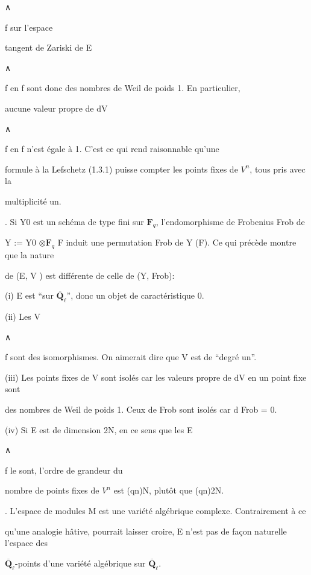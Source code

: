 \documentclass[11pt]{article}
\begin{document}
\noindent ∧\par
\noindent f sur l’espace\par
\noindent tangent de Zariski de E\par
\noindent ∧\par
\noindent f en f sont donc des nombres de Weil de poids 1. En particulier,\par
\noindent aucune valeur propre de dV\par
\noindent ∧\par
\noindent f en f n’est égale à 1. C’est ce qui rend raisonnable qu’une\par
\noindent formule à la Lefschetz (1.3.1) puisse compter les points fixes de \(V^n\), tous pris avec la\par
\noindent multiplicité un.\par
{}. Si Y0 est un schéma de type fini sur \(\mathbf F_q\), l’endomorphisme de Frobenius Frob de\par
\noindent Y := Y0 \(\otimes\)\(\mathbf F_q\) F induit une permutation Frob de Y (F). Ce qui précède montre que la nature\par
\noindent de (E, V ) est différente de celle de (Y, Frob):\par
\noindent (i) E est “sur \(\overline{\mathbf Q}_{\ell}\)”, donc un objet de caractéristique 0.\par
\noindent (ii) Les V\par
\noindent ∧\par
\noindent f sont des isomorphismes. On aimerait dire que V est de “degré un”.\par
\noindent (iii) Les points fixes de V sont isolés car les valeurs propre de dV en un point fixe sont\par
\noindent des nombres de Weil de poids 1. Ceux de Frob sont isolés car d Frob = 0.\par
\noindent (iv) Si E est de dimension 2N, en ce sens que les E\par
\noindent ∧\par
\noindent f le sont, l’ordre de grandeur du\par
\noindent nombre de points fixes de \(V^n\) est (qn)N, plutôt que (qn)2N.\par
\medskip
{}. L’espace de modules M est une variété algébrique complexe. Contrairement à ce\par
\noindent qu’une analogie hâtive, pourrait laisser croire, E n’est pas de façon naturelle l’espace des\par
\noindent \(\overline{\mathbf Q}_{\ell}\)-points d’une variété algébrique sur \(\overline{\mathbf Q}_{\ell}\).\par
\end{document}
